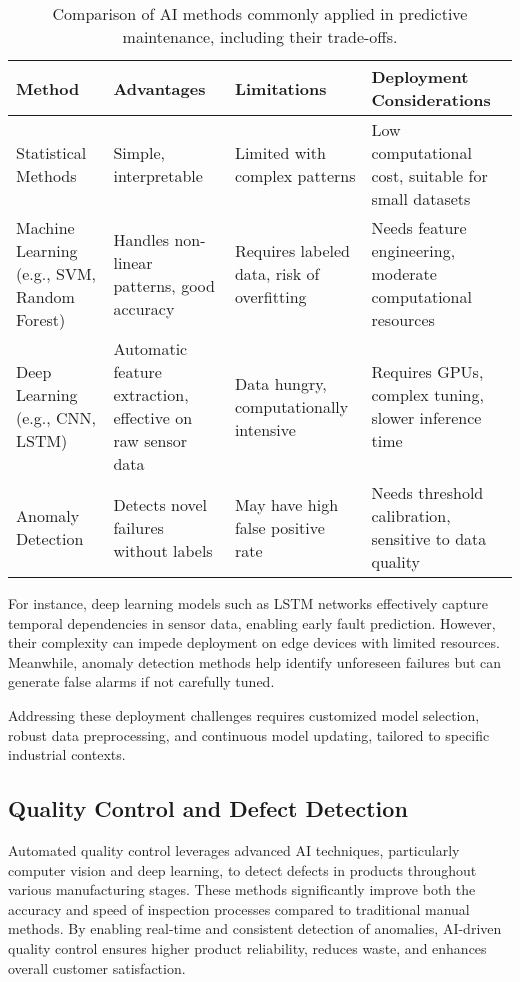 \documentclass[sigconf]{acmart}
\begin{document}
\begin{table*}[htbp]
\centering
\caption{Comparison of AI methods commonly applied in predictive maintenance, including their trade-offs.}
\label{tab:pm_methods}
\begin{adjustbox}{max width=\textwidth}
\begin{tabular}{@{}llll@{}}
\toprule
Method & Advantages & Limitations & Deployment Considerations \\ \midrule
Statistical Methods & Simple, interpretable & Limited with complex patterns & Low computational cost, suitable for small datasets \\
Machine Learning (e.g., SVM, Random Forest) & Handles non-linear patterns, good accuracy & Requires labeled data, risk of overfitting & Needs feature engineering, moderate computational resources \\
Deep Learning (e.g., CNN, LSTM) & Automatic feature extraction, effective on raw sensor data & Data hungry, computationally intensive & Requires GPUs, complex tuning, slower inference time \\
Anomaly Detection & Detects novel failures without labels & May have high false positive rate & Needs threshold calibration, sensitive to data quality \\ \bottomrule
\end{tabular}
\end{adjustbox}
\end{table*}

For instance, deep learning models such as LSTM networks effectively capture temporal dependencies in sensor data, enabling early fault prediction. However, their complexity can impede deployment on edge devices with limited resources. Meanwhile, anomaly detection methods help identify unforeseen failures but can generate false alarms if not carefully tuned.

Addressing these deployment challenges requires customized model selection, robust data preprocessing, and continuous model updating, tailored to specific industrial contexts.

\subsection{Quality Control and Defect Detection}
Automated quality control leverages advanced AI techniques, particularly computer vision and deep learning, to detect defects in products throughout various manufacturing stages. These methods significantly improve both the accuracy and speed of inspection processes compared to traditional manual methods. By enabling real-time and consistent detection of anomalies, AI-driven quality control ensures higher product reliability, reduces waste, and enhances overall customer satisfaction.
\end{document}

